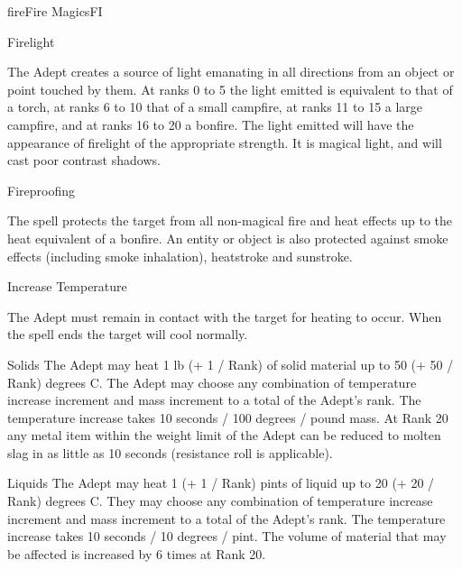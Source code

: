 \begin{College}[2.0]{fire}{Fire Magics}{FI}
\begin{spell}[G-4]{Firelight}
\begin{effects}
The Adept creates a source of light emanating in all directions from
an object or point touched by them. At ranks 0 to 5 the light emitted
is equivalent to that of a torch, at ranks 6 to 10 that of a small
campfire, at ranks 11 to 15 a large campfire, and at ranks 16 to 20 a
bonfire.  The light emitted will have the appearance of firelight of
the appropriate strength.  It is magical light, and will cast poor
contrast shadows.
\end{effects}
\end{spell}

\begin{spell}[G-5]{Fireproofing}

\begin{effects}
The spell protects the target from all non-magical fire and heat
effects up to the heat equivalent of a bonfire.  An entity or object
is also protected against smoke effects (including smoke inhalation),
heatstroke and sunstroke.
\end{effects}
\end{spell}

\begin{spell}[G-6]{Increase Temperature}

\begin{effects}
The Adept must remain in contact with the target for heating to
occur. When the spell ends the target will cool normally.

Solids 
The Adept may heat 1 lb (+ 1 / Rank) of solid material up to 50 (+ 50
/ Rank) degrees C.  The Adept may choose any combination of
temperature increase increment and mass increment to a total of the
Adept’s rank.  The temperature increase takes 10 seconds / 100 degrees
/ pound mass. At Rank 20 any metal item within the weight limit of the
Adept can be reduced to molten slag in as little as 10 seconds
(resistance roll is applicable).

Liquids 
The Adept may heat 1 (+ 1 / Rank) pints of liquid up to 20 (+ 20 /
Rank) degrees C.  They may choose any combination of temperature
increase increment and mass increment to a total of the Adept’s rank.
The temperature increase takes 10 seconds / 10 degrees / pint. The
volume of material that may be affected is increased by 6 times at
Rank 20.


\end{effects}
\end{spell}
\end{College}

